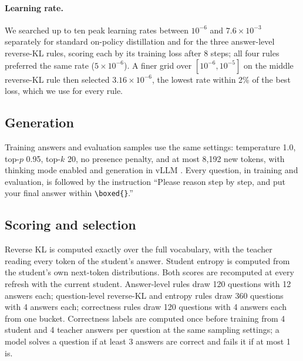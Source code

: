 \documentclass[11pt]{article}
\begin{document}
\paragraph{Learning rate.}
We searched up to ten peak learning rates between $10^{-6}$ and $7.6 \times 10^{-3}$ separately for standard on-policy distillation and for the three answer-level reverse-KL rules, scoring each by its training loss after 8 steps; all four rules preferred the same rate ($5 \times 10^{-6}$).
A finer grid over $[10^{-6}, 10^{-5}]$ on the middle reverse-KL rule then selected $3.16 \times 10^{-6}$, the lowest rate within 2\% of the best loss, which we use for every rule.

\subsection{Generation}
Training answers and evaluation samples use the same settings: temperature 1.0, top-$p$ 0.95, top-$k$ 20, no presence penalty, and at most 8,192 new tokens, with thinking mode enabled and generation in vLLM \citep{kwon2023vllm}.
Every question, in training and evaluation, is followed by the instruction ``Please reason step by step, and put your final answer within \texttt{\textbackslash boxed\{\}}.''

\subsection{Scoring and selection}
Reverse KL is computed exactly over the full vocabulary, with the teacher reading every token of the student's answer.
Student entropy is computed from the student's own next-token distributions.
Both scores are recomputed at every refresh with the current student.
Answer-level rules draw 120 questions with 12 answers each; question-level reverse-KL and entropy rules draw 360 questions with 4 answers each; correctness rules draw 120 questions with 4 answers each from one bucket.
Correctness labels are computed once before training from 4 student and 4 teacher answers per question at the same sampling settings; a model solves a question if at least 3 answers are correct and fails it if at most 1 is.
\end{document}
